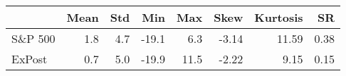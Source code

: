 \begin{tabular}{lrrrrrrr}
\hline
         &   Mean &   Std &   Min &   Max &   Skew &   Kurtosis &   SR \\
\hline
 S\&P 500 &    1.8 &   4.7 & -19.1 &   6.3 &  -3.14 &      11.59 & 0.38 \\
 ExPost  &    0.7 &   5.0 & -19.9 &  11.5 &  -2.22 &       9.15 & 0.15 \\
\hline
\end{tabular}